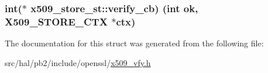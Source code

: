 \subsubsection[{\texorpdfstring{verify\+\_\+cb}{verify_cb}}]{\setlength{\rightskip}{0pt plus 5cm}int($\ast$ x509\+\_\+store\+\_\+st\+::verify\+\_\+cb) (int ok, {\bf X509\+\_\+\+S\+T\+O\+R\+E\+\_\+\+C\+TX} $\ast$ctx)}\hypertarget{structx509__store__st_a2babc2b1c606dc4a45bee39bcb2dddad}{}\label{structx509__store__st_a2babc2b1c606dc4a45bee39bcb2dddad}


The documentation for this struct was generated from the following file\+:\begin{DoxyCompactItemize}
\item 
src/hal/pb2/include/openssl/\hyperlink{x509__vfy_8h}{x509\+\_\+vfy.\+h}\end{DoxyCompactItemize}
